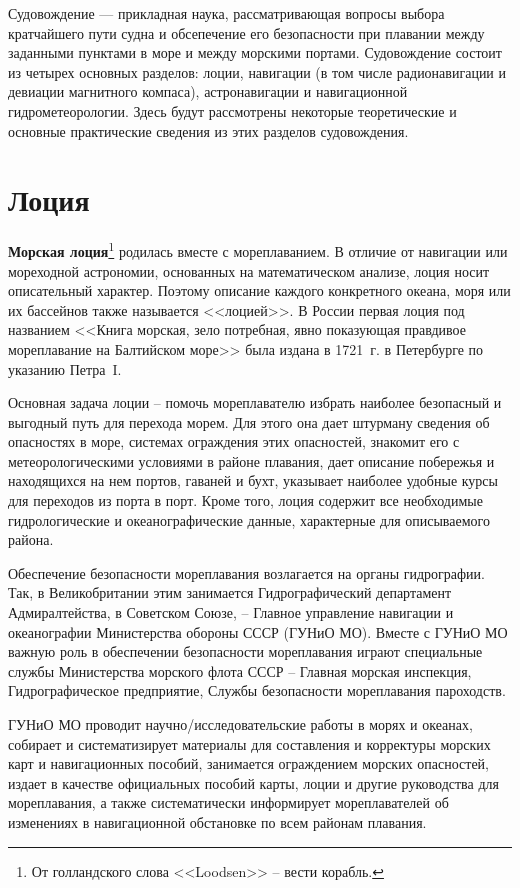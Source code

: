 \documentclass[a4paper, 12pt, twoside, final, book, russian, fittopage, cyremdash]{ncc}
\begin{document}
Судовождение --- прикладная наука, рассматривающая вопросы выбора кратчайшего пути судна и обсепечение его безопасности при плавании между заданными пунктами в море и между морскими портами. Судовождение состоит из четырех основных разделов: лоции, навигации (в том числе радионавигации и девиации магнитного компаса), астронавигации и навигационной гидрометеорологии. Здесь будут рассмотрены некоторые теоретические и основные практические сведения из этих разделов судовождения.

\chapter{Лоция}

\textbf{Морская лоция}\footnote{От голландского слова <<Loodsen>> \--- вести корабль.} родилась вместе с мореплаванием. В отличие от навигации или мореходной астрономии, основанных на математическом анализе, лоция носит описательный характер. Поэтому описание каждого конкретного океана, моря или их бассейнов также называется <<лоцией>>. В России первая лоция под названием <<Книга морская, зело потребная, явно показующая правдивое мореплавание на Балтийском море>> была издана в 1721~г. в Петербурге по указанию Петра~I.

Основная задача лоции \--- помочь мореплавателю избрать наиболее безопасный и выгодный путь для перехода морем. Для этого она дает штурману сведения об опасностях в море, системах ограждения этих опасностей, знакомит его с метеорологическими условиями в районе плавания, дает описание побережья и находящихся на нем портов, гаваней и бухт, указывает наиболее удобные курсы для переходов из порта в порт. Кроме того, лоция содержит все необходимые гидрологические и океанографические данные, характерные для описываемого района.

Обеспечение безопасности мореплавания возлагается на органы гидрографии. Так, в Великобритании этим занимается Гидрографический департамент Адмиралтейства, в Советском Союзе, \--- Главное управление навигации и океанографии Министерства обороны СССР (ГУНиО МО). Вместе с ГУНиО МО важную роль в обеспечении безопасности мореплавания играют специальные службы Министерства морского флота СССР \--- Главная морская инспекция, Гидрографическое предприятие, Службы безопасности мореплавания пароходств.

ГУНиО МО проводит научно\-/исследовательские работы в морях и океанах, собирает и систематизирует материалы для составления и корректуры морских карт и навигационных пособий, занимается ограждением морских опасностей, издает в качестве официальных пособий карты, лоции и другие руководства для мореплавания, а также систематически информирует мореплавателей об изменениях в навигационной обстановке по всем районам плавания.
\end{document}
